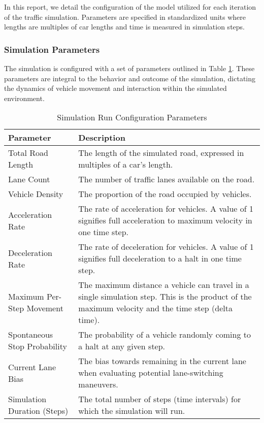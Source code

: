 \documentclass{article}
\begin{document}
In this report, we detail the configuration of the model utilized for each iteration of the traffic simulation. Parameters are specified in standardized units where lengths are multiples of car lengths and time is measured in simulation steps.

\subsubsection{Simulation Parameters}
The simulation is configured with a set of parameters outlined in Table \ref{table:run_config}. These parameters are integral to the behavior and outcome of the simulation, dictating the dynamics of vehicle movement and interaction within the simulated environment.

\begin{table}[H]
\centering
\begin{tabular}{|l|p{8cm}|}
\hline
\textbf{Parameter}            & \textbf{Description} \\
\hline
Total Road Length             & The length of the simulated road, expressed in multiples of a car's length. \\
\hline
Lane Count                    & The number of traffic lanes available on the road. \\
\hline
Vehicle Density               & The proportion of the road occupied by vehicles. \\
\hline
Acceleration Rate             & The rate of acceleration for vehicles. A value of 1 signifies full acceleration to maximum velocity in one time step. \\
\hline
Deceleration Rate             & The rate of deceleration for vehicles. A value of 1 signifies full deceleration to a halt in one time step. \\
\hline
Maximum Per-Step Movement     & The maximum distance a vehicle can travel in a single simulation step. This is the product of the maximum velocity and the time step (delta time). \\
\hline
Spontaneous Stop Probability  & The probability of a vehicle randomly coming to a halt at any given step. \\
\hline
Current Lane Bias             & The bias towards remaining in the current lane when evaluating potential lane-switching maneuvers. \\
\hline
Simulation Duration (Steps)   & The total number of steps (time intervals) for which the simulation will run. \\
\hline
\end{tabular}
\caption{Simulation Run Configuration Parameters}
\label{table:run_config}
\end{table}
\end{document}
